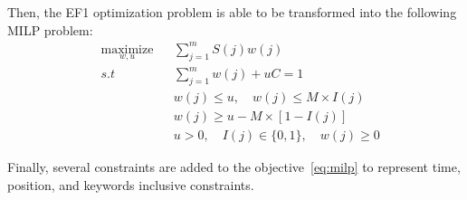 Then, the EF1 optimization problem is able to be transformed into the following MILP problem:
\begin{equation}
\begin{aligned}
& \underset{w,u}{\text{maximize}}
& & \sum_{j=1}^m S(j)w(j) \\
& s.t
& & \sum_{j=1}^m w(j) + uC = 1 \\
& & & w(j) \leqslant u, \quad w(j) \leqslant M\times I(j)  \\
& & & w(j) \geqslant u - M\times [1-I(j)] \\
& & & u > 0,  \quad I(j) \in \{0, 1\}, \quad w(j) \geqslant 0 \label{eq:milp}
\end{aligned}
\end{equation}

Finally, several constraints are added to the objective~\eqref{eq:milp} to represent time, position, and keywords inclusive constraints.


